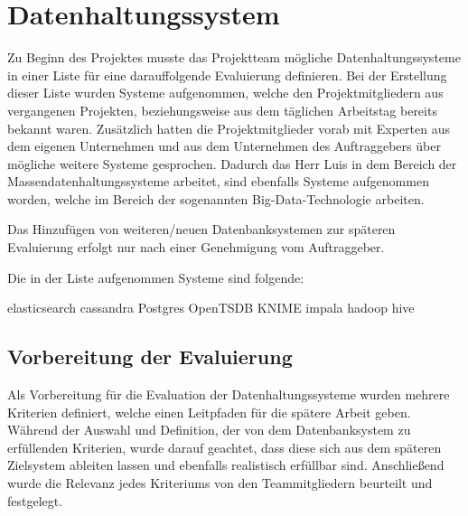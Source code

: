 {\section{Datenhaltungssystem}
\label{sec:datenhaltungssystem}
Zu Beginn des Projektes musste das Projektteam mögliche Datenhaltungssysteme in
einer Liste für eine darauffolgende Evaluierung definieren. Bei der Erstellung
dieser Liste wurden Systeme aufgenommen, welche den Projektmitgliedern aus
vergangenen Projekten, beziehungsweise aus dem täglichen Arbeitstag bereits
bekannt waren. Zusätzlich hatten die Projektmitglieder vorab mit Experten aus
dem eigenen Unternehmen und aus dem Unternehmen des Auftraggebers über mögliche
weitere Systeme gesprochen. Dadurch das Herr Luis in dem Bereich der
Massendatenhaltungssysteme arbeitet, sind ebenfalls Systeme aufgenommen worden,
welche im Bereich der sogenannten Big\hyp{}Data\hyp{}Technologie arbeiten.

Das Hinzufügen von weiteren/neuen Datenbanksystemen zur späteren
Evaluierung erfolgt nur nach einer Genehmigung vom Auftraggeber.

Die in der Liste aufgenommen Systeme sind folgende:

\begin{outline}
  \1 elasticsearch
  \1 cassandra
  \1 Postgres
  \1 OpenTSDB
  \1 KNIME
  \1 impala
  \1 hadoop
  \1 hive
\end{outline}
\nl%

\subsection{Vorbereitung der Evaluierung}
\label{subsec:DBS_vorbereitung_der_evaluierung}
Als Vorbereitung für die Evaluation der Datenhaltungssysteme wurden mehrere
Kriterien definiert, welche einen Leitpfaden für die spätere Arbeit geben.
Während der Auswahl und Definition, der von dem Datenbanksystem zu erfüllenden
Kriterien, wurde darauf geachtet, dass diese sich aus dem späteren Zielsystem
ableiten lassen und ebenfalls realistisch erfüllbar sind. Anschließend wurde
die Relevanz jedes Kriteriums von den Teammitgliedern beurteilt und festgelegt.

}
